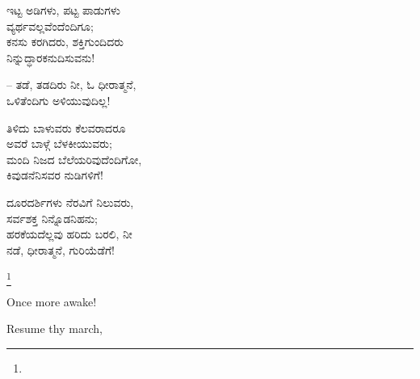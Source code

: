 \begin{myquote}
ಇಟ್ಟ ಅಡಿಗಳು, ಪಟ್ಟ ಪಾಡುಗಳು\\ವ್ಯರ್ಥವಲ್ಲವೆಂದೆಂದಿಗೂ;\\ಕನಸು ಕರಗಿದರು, ಶಕ್ತಿಗುಂದಿದರು\\ನಿನ್ನುದ್ಧಾರಕನುದಿಸುವನು!
\end{myquote}

\begin{flushright}
– ತಡೆ, ತಡದಿರು ನೀ, ಓ ಧೀರಾತ್ಮನೆ,\\ಒಳಿತೆಂದಿಗು ಅಳಿಯುವುದಿಲ್ಲ!
\end{flushright}

\begin{myquote}
ತಿಳಿದು ಬಾಳುವರು ಕೆಲವರಾದರೂ\\ಅವರೆ ಬಾಳ್ಗೆ ಬೆಳಕೀಯುವರು;\\ಮಂದಿ ನಿಜದ ಬೆಲೆಯರಿವುದೆಂದಿಗೋ,\\ಕಿವುಡನೆನಿಸವರ ನುಡಿಗಳಿಗೆ!
\end{myquote}

\begin{myquote}
ದೂರದರ್ಶಿಗಳು ನೆರವಿಗೆ ನಿಲುವರು,\\ಸರ್ವಶಕ್ತ ನಿನ್ನೊಡನಿಹನು;\\ಹರಕೆಯದೆಲ್ಲವು ಹರಿದು ಬರಲಿ, ನೀ\\ನಡೆ, ಧೀರಾತ್ಮನೆ, ಗುರಿಯೆಡೆಗೆ!
\end{myquote}

\protect\footnote{}

Once more awake!

\begin{myquote}
\end{myquote}

Resume thy march,

\begin{myquote}
\end{myquote}


